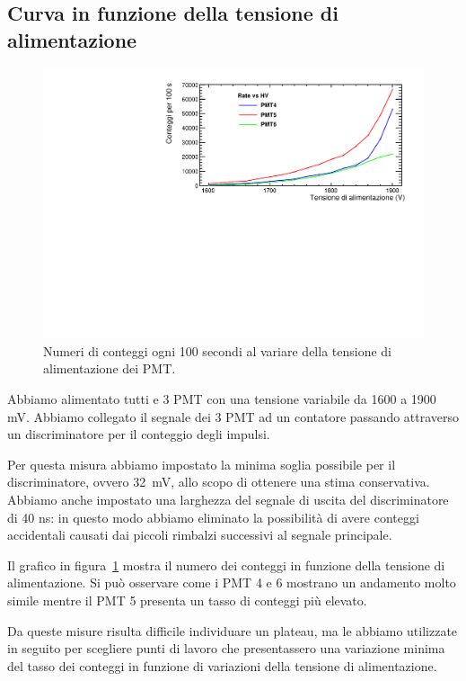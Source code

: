 \documentclass[a4paper,10pt]{article}
\begin{document}
\subsection{Curva in funzione della tensione di alimentazione}
\begin{figure}
\centering
\includegraphics[width=\textwidth]{fig/rate-hv}
\caption{Numeri di conteggi ogni 100 secondi al variare della tensione di alimentazione dei PMT.}
\label{fig:rate-hv}
\end{figure}
Abbiamo alimentato tutti e 3 PMT con una tensione variabile da 1600 a 1900 mV. Abbiamo collegato il segnale dei 3 PMT ad un contatore passando attraverso un discriminatore per il conteggio degli impulsi.


Per questa misura abbiamo impostato la minima soglia possibile per il discriminatore, ovvero 32~mV, allo scopo di ottenere una stima conservativa. 
Abbiamo anche impostato una larghezza del segnale di uscita del discriminatore di 40 ns: in questo modo abbiamo eliminato la possibilità di avere conteggi accidentali causati dai piccoli rimbalzi successivi al segnale principale. 

Il grafico in figura~\ref{fig:rate-hv} mostra il numero dei conteggi in funzione della tensione di alimentazione. Si può osservare come i PMT 4 e 6 mostrano un andamento molto simile mentre il PMT 5 presenta un tasso di conteggi più elevato.

Da queste misure risulta difficile individuare un plateau, ma le abbiamo utilizzate in seguito per scegliere punti di lavoro che presentassero una variazione minima del tasso dei conteggi in funzione di variazioni della tensione di alimentazione.
\end{document}

